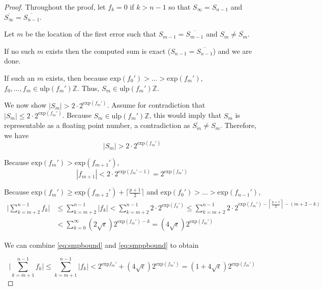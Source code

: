 \documentclass[12pt]{article}
\providecommand{\Z}{\ensuremath{\mathbb{Z}}}
\providecommand{\exp}{\ensuremath{\text{exp}}}
\providecommand{\ulp}{\ensuremath{\text{ulp}}}
\theoremstyle{definition}
\numberwithin{equation}{section}
\numberwithin{figure}{section}
\begin{document}
    \begin{proof}

      Throughout the proof, let $f_k = 0$ if $k > n - 1$ so that $S_{\infty} = S_{n - 1}$ and $\overline{S_{\infty}} = \overline{S_{n - 1}}$.

      Let $m$ be the location of the first error such that $S_{m - 1} = \overline{S_{m - 1}}$ and $S_{m} \neq \overline{S_{m}}$.

      If no such $m$ exists then the computed sum is exact ($S_{n - 1} = \overline{S_{n - 1}}$) and we are done.

      If such an $m$ exists, then because $\exp(f_0') > ... > \exp(f_m')$, $f_0, ..., f_m \in \ulp(f_m')\Z$. Thus, $S_m \in \ulp(f_m')\Z$.

      We now show $|S_m| > 2 \cdot 2^{\exp(f_m')}$. Assume for contradiction that $|S_m| \leq 2 \cdot 2^{\exp(f_m')}$. Because $S_m \in \ulp(f_m')\Z$, this would imply that $S_m$ is representable as a floating point number, a contradiction as $\overline{S_m} \neq S_m$. Therefore, we have
      \begin{equation}
        |S_m| > 2 \cdot 2^{\exp(f_m')}
        \label{eq:smbound}
      \end{equation}

      Because $\exp(f_m') > \exp(f_{m + 1}')$,
      \begin{equation}
        |f_{m + 1}| < 2\cdot2^{\exp(f_m' - 1)} = 2^{\exp(f_m')}
        \label{eq:smpbound}
      \end{equation}

      Because $\exp(f_m') \geq \exp(f_{m + 2}') + \lceil\frac{p + 1}{2}\rceil$ and $\exp(f_0') > ... > \exp(f_{n - 1}')$,
      \begin{align}
        \bigl|\sum \limits_{k = m + 2}^{n - 1} f_k\bigr| &\leq \sum \limits_{k = m + 2}^{n - 1} |f_k| < \sum \limits_{k = m + 2}^{n - 1} 2 \cdot 2^{\exp(f_k')} \leq \sum \limits_{k = m + 2}^{n - 1} 2 \cdot 2^{\exp(f_m') - \left\lceil\frac{p + 1}{2}\right\rceil - (m + 2 - k)} \nonumber \\
        &< \sum \limits_{k = 0}^{\infty} \left(2 \sqrt{\epsilon}\right)2^{\exp(f_m') - k} = \left(4\sqrt\epsilon\right)2^{\exp(f_m')}
        \label{eq:smppbound}
      \end{align}

      We can combine  \eqref{eq:smpbound} and \eqref{eq:smppbound} to obtain

      \begin{equation}
        \bigl|\sum\limits_{k = m + 1}^{n - 1} f_k\bigr| \leq \sum\limits_{k = m + 1}^{n - 1} |f_k| < 2^{\exp{f_m'}} + \left(4 \sqrt{\epsilon}\right) 2^{\exp(f_m')} = \left(1 + 4 \sqrt\epsilon \right)2^{\exp(f_m')}
        \label{eq:smsbound}
      \end{equation}


\end{proof}
\end{document}
